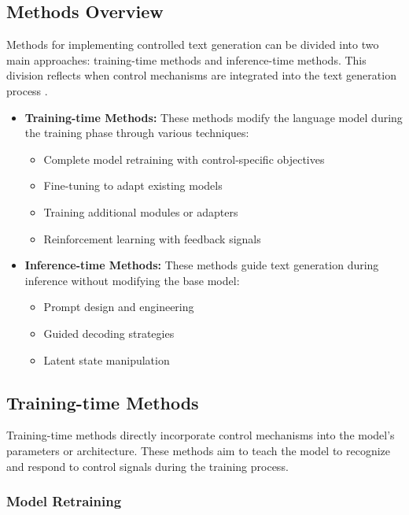 \subsection{Methods Overview}

Methods for implementing controlled text generation can be divided into two main approaches: training-time methods and inference-time methods.
This division reflects when control mechanisms are integrated into the text generation process \cite{liang2024controllabletextgenerationlarge, he-etal-2022-ctrlsum}.

\begin{itemize}
   \item \textbf{Training-time Methods:} These methods modify the language model during the training phase through various techniques:
        \begin{itemize}
            \item Complete model retraining with control-specific objectives
            \item Fine-tuning to adapt existing models
            \item Training additional modules or adapters
            \item Reinforcement learning with feedback signals
        \end{itemize}
       
   \item \textbf{Inference-time Methods:} These methods guide text generation during inference without modifying the base model:
       \begin{itemize}
            \item Prompt design and engineering
            \item Guided decoding strategies
            \item Latent state manipulation
        \end{itemize}
\end{itemize}

\subsection{Training-time Methods}
\label{c2:s:training-time}

Training-time methods directly incorporate control mechanisms into the model's parameters or architecture. These methods aim to teach the model to recognize and respond to control signals during the training process.

\subsubsection{Model Retraining}

